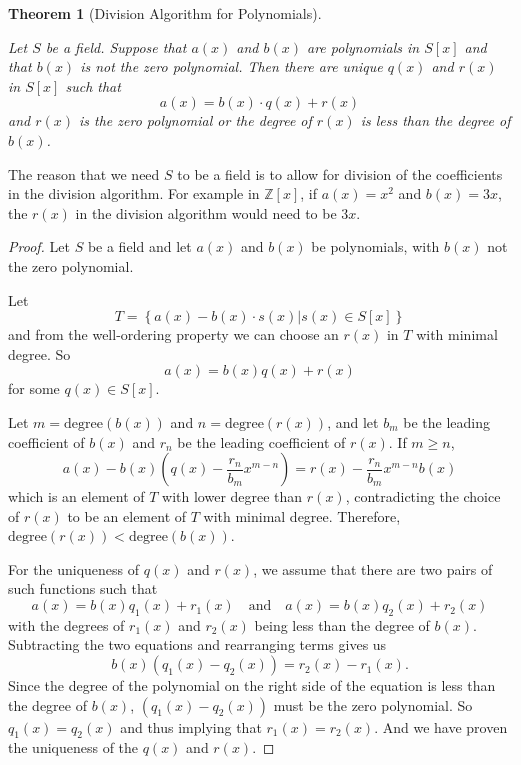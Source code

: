 \documentclass[
]{book}
\newtheorem{theorem}{Theorem}[chapter]
\theoremstyle{definition}
\theoremstyle{definition}
\theoremstyle{definition}
\theoremstyle{definition}
\theoremstyle{remark}
\begin{document}
\begin{theorem}[Division Algorithm for Polynomials]
\protect\hypertarget{thm:Division-Algorithm-Poly}{}\label{thm:Division-Algorithm-Poly}

Let \(S\) be a field. Suppose that \(a(x)\) and \(b(x)\) are polynomials in \(S[x]\) and that \(b(x)\) is not the zero polynomial. Then there are unique \(q(x)\) and \(r(x)\) in \(S[x]\) such that
\[a(x)=b(x)\cdot q(x) + r(x)\] and \(r(x)\) is the zero polynomial or the degree of \(r(x)\) is less than the degree of \(b(x)\).

\end{theorem}

The reason that we need \(S\) to be a field is to allow for division of the coefficients in the division algorithm. For example in \(\mathbb{Z}[x]\), if \(a(x)=x^2\) and \(b(x)=3x\), the \(r(x)\) in the division algorithm would need to be \(3x\).

\begin{proof}

Let \(S\) be a field and let \(a(x)\) and \(b(x)\) be polynomials, with \(b(x)\) not the zero polynomial.

Let
\[T= \left\{ a(x)-b(x)\cdot s(x) | s(x) \in S[x]\right\}\] and from the well-ordering property we can choose an \(r(x)\) in \(T\) with minimal degree. So \[a(x)=b(x) q(x) + r(x)\] for some \(q(x)\in S[x]\).

Let \(m=\mathrm{degree}(b(x))\) and \(n=\mathrm{degree}(r(x))\), and let \(b_m\) be the leading coefficient of \(b(x)\) and \(r_n\) be the leading coefficient of \(r(x)\). If \(m\geq n\),
\[a(x)-b(x)\left(q(x)- \frac{r_n}{b_m} x^{m-n}\right)= r(x)-\frac{r_n}{b_m} x^{m-n} b(x) \] which is an element of \(T\) with lower degree than \(r(x)\), contradicting the choice of \(r(x)\) to be an element of \(T\) with minimal degree. Therefore, \(\mathrm{degree}(r(x))<\mathrm{degree}(b(x))\).

For the uniqueness of \(q(x)\) and \(r(x)\), we assume that there are two pairs of such functions such that
\[a(x)=b(x) q_1(x)+r_1(x) \quad \mbox{and} \quad a(x)=b(x) q_2(x)+r_2(x)\] with the degrees of \(r_1(x)\) and \(r_2(x)\) being less than the degree of \(b(x)\). Subtracting the two equations and rearranging terms gives us \[b(x) \left( q_1(x)-q_2(x) \right) = r_2(x)-r_1(x).\] Since the degree of the polynomial on the right side of the equation is less than the degree of \(b(x)\), \((q_1(x)-q_2(x))\) must be the zero polynomial. So \(q_1(x)= q_2(x)\) and thus implying that \(r_1(x)=r_2(x)\). And we have proven the uniqueness of the \(q(x)\) and \(r(x)\).

\end{proof}
\end{document}
